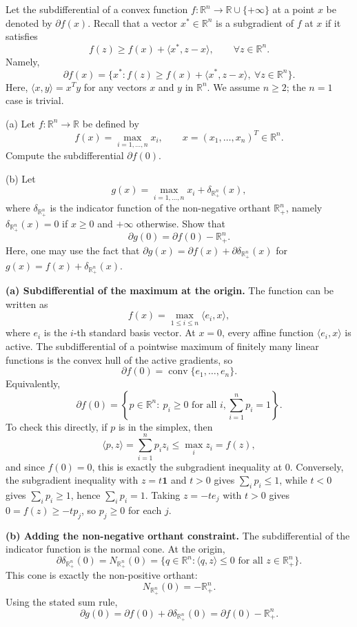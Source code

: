 \begin{exercise}
\label{applied:2026:6}
Let the subdifferential of a convex function $f:\mathbb{R}^n\to \mathbb{R}\cup\{+\infty\}$
at a point $x$ be denoted by $\partial f(x)$. Recall that a vector $x^*\in \mathbb{R}^n$ is a
subgradient of $f$ at $x$ if it satisfies
\[
f(z)\geq f(x)+\langle x^*,z-x\rangle,\qquad \forall z\in \mathbb{R}^n.
\]
Namely,
\[
\partial f(x)=\{x^*: f(z)\geq f(x)+\langle x^*,z-x\rangle,\ \forall z\in \mathbb{R}^n\}.
\]
Here, $\langle x,y\rangle=x^Ty$ for any vectors $x$ and $y$ in $\mathbb{R}^n$. We assume
$n\geq 2$; the $n=1$ case is trivial.

(a) Let $f:\mathbb{R}^n\to \mathbb{R}$ be defined by
\[
f(x)=\max_{i=1,\ldots,n}x_i,\qquad x=(x_1,\ldots,x_n)^T\in \mathbb{R}^n.
\]
Compute the subdifferential $\partial f(0)$.

(b) Let
\[
g(x)=\max_{i=1,\ldots,n}x_i+\delta_{\mathbb{R}_+^n}(x),
\]
where $\delta_{\mathbb{R}_+^n}$ is the indicator function of the non-negative orthant
$\mathbb{R}_+^n$, namely $\delta_{\mathbb{R}_+^n}(x)=0$ if $x\geq 0$ and $+\infty$ otherwise.
Show that
\[
\partial g(0)=\partial f(0)-\mathbb{R}_+^n.
\]
Here, one may use the fact that
$\partial g(x)=\partial f(x)+\partial \delta_{\mathbb{R}_+^n}(x)$ for
$g(x)=f(x)+\delta_{\mathbb{R}_+^n}(x)$.
\end{exercise}

\begin{solution}
\textbf{(a) Subdifferential of the maximum at the origin.}
The function can be written as
\[
f(x)=\max_{1\leq i\leq n}\langle e_i,x\rangle,
\]
where $e_i$ is the $i$-th standard basis vector. At $x=0$, every affine function
$\langle e_i,x\rangle$ is active. The subdifferential of a pointwise maximum of finitely many
linear functions is the convex hull of the active gradients, so
\[
\partial f(0)=\operatorname{conv}\{e_1,\ldots,e_n\}.
\]
Equivalently,
\[
\partial f(0)=\left\{p\in \mathbb{R}^n:\ p_i\geq 0\text{ for all }i,
\sum_{i=1}^n p_i=1\right\}.
\]
To check this directly, if $p$ is in the simplex, then
\[
\langle p,z\rangle=\sum_{i=1}^n p_i z_i\leq \max_i z_i=f(z),
\]
and since $f(0)=0$, this is exactly the subgradient inequality at $0$. Conversely, the
subgradient inequality with $z=t\mathbf{1}$ and
$t>0$ gives $\sum_i p_i\leq 1$, while $t<0$ gives $\sum_i p_i\geq 1$, hence
$\sum_i p_i=1$. Taking $z=-te_j$ with $t>0$ gives $0=f(z)\geq -tp_j$, so $p_j\geq 0$ for
each $j$.

\textbf{(b) Adding the non-negative orthant constraint.}
The subdifferential of the indicator function is the normal cone. At the origin,
\[
\partial \delta_{\mathbb{R}_+^n}(0)
=N_{\mathbb{R}_+^n}(0)
=\{q\in \mathbb{R}^n:\langle q,z\rangle\leq 0\text{ for all }z\in \mathbb{R}_+^n\}.
\]
This cone is exactly the non-positive orthant:
\[
N_{\mathbb{R}_+^n}(0)=-\mathbb{R}_+^n.
\]
Using the stated sum rule,
\[
\partial g(0)
=\partial f(0)+\partial \delta_{\mathbb{R}_+^n}(0)
=\partial f(0)-\mathbb{R}_+^n.
\]
\end{solution}
